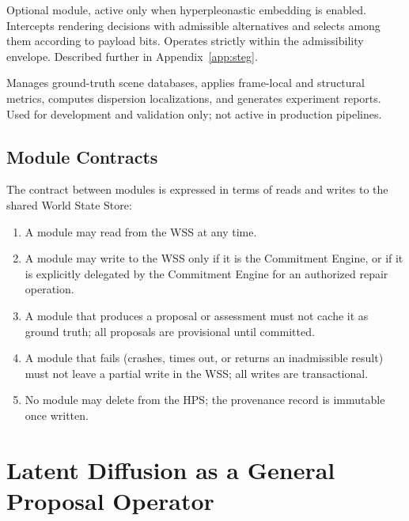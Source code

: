 \documentclass[12pt,a4paper]{article}
\theoremstyle{plain}
\theoremstyle{definition}
\theoremstyle{remark}
\begin{document}
\begin{description}[leftmargin=2em,itemsep=6pt]
\item[\textbf{Steganographic Selector Layer (SSL).}] Optional module, active only when hyperpleonastic embedding is enabled. Intercepts rendering decisions with admissible alternatives and selects among them according to payload bits. Operates strictly within the admissibility envelope. Described further in Appendix~\ref{app:steg}.

\item[\textbf{Evaluation Harness (EH).}] Manages ground-truth scene databases, applies frame-local and structural metrics, computes dispersion localizations, and generates experiment reports. Used for development and validation only; not active in production pipelines.

\end{description}

\subsection{Module Contracts}

The contract between modules is expressed in terms of reads and writes to the shared World State Store:

\begin{enumerate}[leftmargin=2em,itemsep=0pt]
\item A module may read from the WSS at any time.
\item A module may write to the WSS only if it is the Commitment Engine, or if it is explicitly delegated by the Commitment Engine for an authorized repair operation.
\item A module that produces a proposal or assessment must not cache it as ground truth; all proposals are provisional until committed.
\item A module that fails (crashes, times out, or returns an inadmissible result) must not leave a partial write in the WSS; all writes are transactional.
\item No module may delete from the HPS; the provenance record is immutable once written.
\end{enumerate}

\section{Latent Diffusion as a General Proposal Operator}
\label{sec:diffusion}
\end{document}
